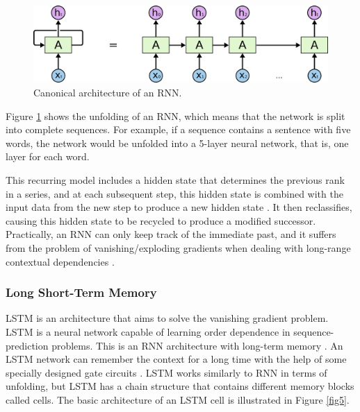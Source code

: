 \documentclass[conference]{IEEEtran}
\begin{document}
\begin{figure}[htbp]
\centerline{\includegraphics[scale=0.2]{images/rnn.png}}
\caption{Canonical architecture of an RNN.}
\label{fig4}
\end{figure}

Figure \ref{fig4} shows the unfolding of an RNN, which means that the network is split into complete sequences. For example, if a sequence contains a sentence with five words, the network would be unfolded into a 5-layer neural network, that is, one layer for each word.

This recurring model includes a hidden state that determines the previous rank in a series, and at each subsequent step, this hidden state is combined with the input data from the new step to produce a new hidden state \cite{b18}. It then reclassifies, causing this hidden state to be recycled to produce a modified successor. Practically, an RNN can only keep track of the immediate past, and it suffers from the problem of vanishing/exploding gradients when dealing with long-range contextual dependencies
\cite{b6}.

\subsubsection{Long Short-Term Memory}
LSTM is an architecture that aims to solve the vanishing gradient problem. LSTM is a neural network capable of learning order dependence in sequence-prediction problems. This is an RNN architecture with long-term memory \cite{b13}. An LSTM network can remember the context for a long time with the help of some specially designed gate circuits \cite{b6}. LSTM works similarly to RNN in terms of unfolding, but LSTM has a chain structure that contains different memory blocks called cells. The basic architecture of an LSTM cell is illustrated in Figure \ref{fig5}.
\end{document}
